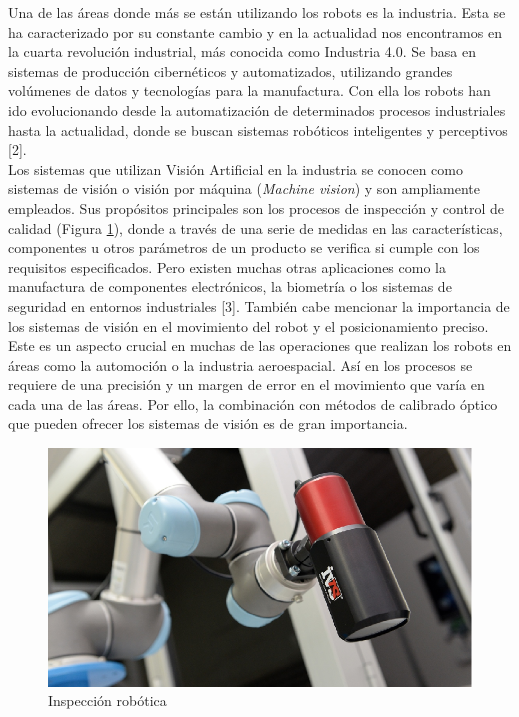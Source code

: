 \documentclass{bmvc2k}
\begin{document}
Una de las áreas donde más se están utilizando los robots es la industria. Esta se ha caracterizado por su constante cambio y en la actualidad nos encontramos en la cuarta revolución industrial, más conocida como Industria 4.0. Se basa en sistemas de producción cibernéticos y automatizados, utilizando grandes volúmenes de datos y tecnologías para la manufactura. Con ella los robots han ido evolucionando desde la automatización de determinados procesos industriales hasta la actualidad, donde se buscan sistemas robóticos inteligentes y perceptivos [2].\\
Los sistemas que utilizan Visión Artificial en la industria se conocen como sistemas de visión o visión por máquina (\textit{Machine vision}) y son ampliamente empleados. Sus propósitos principales son los procesos de inspección y control de calidad (Figura \ref{fig:robot}), donde a través de una serie de medidas en las características, componentes u otros parámetros de un producto se verifica si cumple con los requisitos especificados. Pero existen muchas otras aplicaciones como la manufactura de componentes electrónicos, la biometría o los sistemas de seguridad en entornos industriales [3]. También cabe mencionar la importancia de los sistemas de visión en el movimiento del robot y el posicionamiento preciso. Este es un aspecto crucial en muchas de las operaciones que realizan los robots en áreas como la automoción o la industria aeroespacial. Así en los procesos se requiere de una precisión y un margen de error en el movimiento que varía en cada una de las áreas. Por ello, la combinación con métodos de calibrado óptico que pueden ofrecer los sistemas de visión es de gran importancia.
\begin{figure}[H]
\begin{center}
\includegraphics[scale=0.3]{Collaborative-Robot-Inspection.png}
\caption{Inspección robótica}
\label{fig:robot}
\end{center}
\end{figure}
\end{document}
